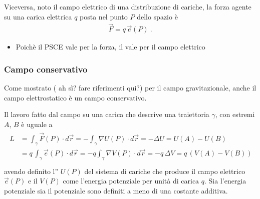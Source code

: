 \documentclass[letterpaper,10pt,italian]{jupyterBook}
\begin{document}
\sphinxAtStartPar
Viceversa, noto il campo elettrico di una distribuzione di cariche, la forza agente su una carica elettrica \(q\) posta nel punto \(P\) dello spazio è
\begin{equation*}
\begin{split}\vec{F} = q \, \vec{e}(P) \ .\end{split}
\end{equation*}\begin{itemize}
\item {} 
\sphinxAtStartPar
{} Poichè il PSCE vale per la forza, il  vale per il campo elettrico

\end{itemize}


\subsubsection{Campo conservativo}
\label{\detokenize{ch/electromagnetism/electrostatics:campo-conservativo}}
\sphinxAtStartPar
Come mostrato (  ah sì? fare riferimenti qui?) per il campo gravitazionale, anche il campo elettrostatico è un campo conservativo.

\sphinxAtStartPar
Il lavoro fatto dal campo su una carica che descrive una traiettoria \(\gamma\), con estremi \(A\), \(B\) è uguale a
\begin{equation*}
\begin{split}\begin{aligned}
  L & = \int_{\gamma} \vec{F}(P) \cdot d \vec{r} = - \int_{\gamma} \nabla U(P) \cdot d \vec{r} = - \Delta U = U(A) - U(B) \\
    & = q \, \int_{\gamma} \vec{e}(P) \cdot d \vec{r} = - q \int_{\gamma} \nabla V(P) \cdot d \vec{r} = - q \, \Delta V = q \, \left( V(A) - V(B) \right) \\
\end{aligned}\end{split}
\end{equation*}
\sphinxAtStartPar
avendo definito l” \(U(P)\) del sistema di cariche che produce il campo elettrico \(\vec{e}(P)\) e il  \(V(P)\) come l’energia potenziale per unità di carica \(q\). Sia l’energia potenziale sia il potenziale sono definiti a meno di una costante additiva.
\end{document}
